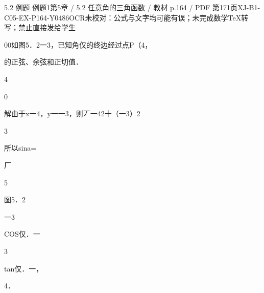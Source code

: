 \begin{bankitem}{5.2 例题 例题1}{第5章 / 5.2 任意角的三角函数 / 教材 p.164 / PDF 第171页}{XJ-B1-C05-EX-P164-Y0486}{OCR未校对：公式与文字均可能有误；未完成数学TeX转写；禁止直接发给学生}
\begin{ocrdraft}
\par
00如图5．2一3，已知角仅的终边经过点P（4，
\par
的正弦、余弦和正切值．
\par
4
\par
0
\par
解由于x一4，y一一3，则丆一42十（一3）2
\par
3
\par
所以sina=
\par
厂
\par
5
\par
图5．2
\par
一3
\par
COS仅．一
\par
3
\par
tan仅．一，
\par
4．
\end{ocrdraft}
\end{bankitem}
